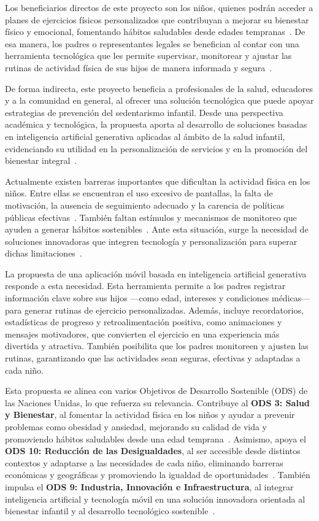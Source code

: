 			Los beneficiarios directos de este proyecto son los niños, quienes podrán acceder a planes de ejercicios físicos personalizados que contribuyan a mejorar su bienestar físico y emocional, fomentando hábitos saludables desde edades tempranas~\cite{Xu2022}. De esa manera, los padres o representantes legales se benefician al contar con una herramienta tecnológica que les permite supervisar, monitorear y ajustar las rutinas de actividad física de sus hijos de manera informada y segura~\cite{Yao2015}.
			
			De forma indirecta, este proyecto beneficia a profesionales de la salud, educadores y a la comunidad en general, al ofrecer una solución tecnológica que puede apoyar estrategias de prevención del sedentarismo infantil. Desde una perspectiva académica y tecnológica, la propuesta aporta al desarrollo de soluciones basadas en inteligencia artificial generativa aplicadas al ámbito de la salud infantil, evidenciando su utilidad en la personalización de servicios y en la promoción del bienestar integral~\cite{Pareek2025}.
			
			Actualmente existen barreras importantes que dificultan la actividad física en los niños. Entre ellas se encuentran el uso excesivo de pantallas, la falta de motivación, la ausencia de seguimiento adecuado y la carencia de políticas públicas efectivas~\cite{Hesketh2017}. También faltan estímulos y mecanismos de monitoreo que ayuden a generar hábitos sostenibles~\cite{Zhu2024}. Ante esta situación, surge la necesidad de soluciones innovadoras que integren tecnología y personalización para superar dichas limitaciones~\cite{Direito2017}.
			
			La propuesta de una aplicación móvil basada en inteligencia artificial generativa responde a esta necesidad. Esta herramienta permite a los padres registrar información clave sobre sus hijos ---como edad, intereses y condiciones médicas--- para generar rutinas de ejercicio personalizadas. Además, incluye recordatorios, estadísticas de progreso y retroalimentación positiva, como animaciones y mensajes motivadores, que convierten el ejercicio en una experiencia más divertida y atractiva. También posibilita que los padres monitoreen y ajusten las rutinas, garantizando que las actividades sean seguras, efectivas y adaptadas a cada niño.
			
			Esta propuesta se alinea con varios Objetivos de Desarrollo Sostenible (ODS) de las Naciones Unidas, lo que refuerza su relevancia. Contribuye al \textbf{ODS 3: Salud y Bienestar}, al fomentar la actividad física en los niños y ayudar a prevenir problemas como obesidad y ansiedad, mejorando su calidad de vida y promoviendo hábitos saludables desde una edad temprana~\cite{UN2015}. Asimismo, apoya el \textbf{ODS 10: Reducción de las Desigualdades}, al ser accesible desde distintos contextos y adaptarse a las necesidades de cada niño, eliminando barreras económicas y geográficas y promoviendo la igualdad de oportunidades~\cite{UN2015}. También impulsa el \textbf{ODS 9: Industria, Innovación e Infraestructura}, al integrar inteligencia artificial y tecnología móvil en una solución innovadora orientada al bienestar infantil y al desarrollo tecnológico sostenible~\cite{UN2015}.
			
